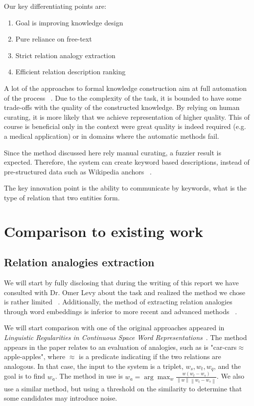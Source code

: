 \documentclass[11pt,a4paper]{article}
\newcommand{\norm}[1]{\left\lVert#1\right\rVert}
\begin{document}
Our key differentiating points are:
\begin{enumerate}
\item Goal is improving knowledge design
\item Pure reliance on free-text
\item Strict relation analogy extraction
\item Efficient relation description ranking
\end{enumerate}

A lot of the approaches to formal knowledge construction aim at full automation of the process ~\cite{maedche2001ontology}. Due to the complexity of the task, it is bounded to have some trade-offs with the quality of the constructed knowledge. By relying on human curating, it is more likely that we achieve representation of higher quality. This of course is beneficial only in the context were great quality is indeed required (e.g. a medical application) or in domains where the automatic methods fail.

Since the method discussed here rely manual curating, a fuzzier result is expected. Therefore, the system can create keyword based descriptions, instead of pre-structured data such as Wikipedia anchors ~\cite{wang2014knowledge}.

The key innovation point is the ability to communicate by keywords, what is the type of relation that two entities form.

\section{Comparison to existing work}

\subsection{Relation analogies extraction} \label{AE}

We will start by fully disclosing that during the writing of this report we have consulted with Dr. Omer Levy about the task and realized the method we chose is rather limited ~\cite{linzen2016issues}. Additionally, the method of extracting relation analogies through word embeddings is inferior to more recent and advanced methods ~\cite{drozd2016word}.

We will start comparison with one of the original approaches appeared in \textit{Linguistic Regularities in Continuous Space Word Representations}~\cite{mikolov2013linguistic}. The method appears in the paper relates to an evaluation of analogies, such as is "car-cars$\approx$apple-apples", where $\approx$ is a predicate indicating if the two relations are analogous. In that case, the input to the system is a triplet, $w_s,w_t,w_q$, and the goal is to find $w_a$. The method in use is $w_a = \arg \max_w \frac{w \left(w_t-w_s\right)}{\norm{w}\norm{w_t-w_s}}$. We also use a similar method, but using a threshold on the similarity to determine that some candidates may introduce noise.
\end{document}
